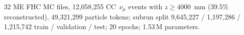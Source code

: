 32 ME FHC MC files, 12{,}058{,}255 CC~$\nu_\mu$ events with $z \ge 4000$~mm (39.5\% reconstructed), 49{,}321{,}299 particle tokens; subrun split 9{,}645{,}227 / 1{,}197{,}286 / 1{,}215{,}742 train / validation / test; 20 epochs; 1.53\,M parameters.
